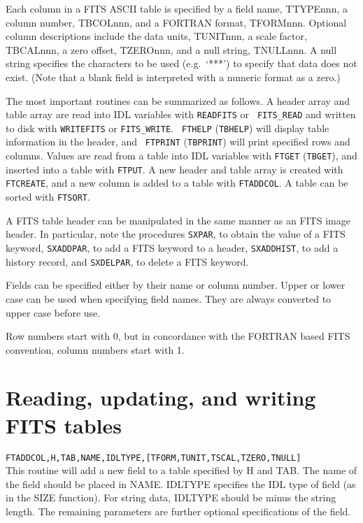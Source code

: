 Each column in a FITS ASCII table 
is specified by a field name, TTYPEnnn, a column number, TBCOLnnn,
and a FORTRAN format, TFORMnnn.  Optional column descriptions include
the data units, TUNITnnn, a scale factor, TBCALnnn, a zero offset,
TZEROnnn, and a null string, TNULLnnn.  A null string specifies the 
characters to be used (e.g.\  `***') to specify that data does not exist.
(Note that a blank field is interpreted with a numeric format as a zero.) 

The most important routines can be summarized as follows. A header array and
table array are read into IDL variables with {\tt READFITS} or {\tt
FITS\_READ}  and written to disk with {\tt WRITEFITS} or {\tt FITS\_WRITE}.  {\tt
FTHELP} ({\tt TBHELP}) will display table information in the header, and {\tt
FTPRINT} ({\tt TBPRINT}) will print specified rows and columns.  Values are read from a table
into IDL variables with {\tt FTGET} ({\tt TBGET}), and inserted into a table with
{\tt FTPUT}.  A new header and table array is created with {\tt FTCREATE}, and
a new column is added to a table with {\tt FTADDCOL}.  A table can be sorted
with {\tt FTSORT}.

A FITS table header can be manipulated in the same manner as an FITS 
image header.
In particular, note the procedures {\tt SXPAR}, to obtain the value of a FITS
keyword, {\tt SXADDPAR}, to add a FITS keyword to a header, {\tt SXADDHIST}, to add
a history record, and {\tt SXDELPAR}, to delete a FITS keyword.

Fields can be specified either by their name or column number.   
Upper or lower case can be used when specifying field names.
They are always converted to upper case before use.

Row numbers start with 0, but in concordance with the FORTRAN based
FITS convention, column numbers start with 1.
                          
\section{Reading, updating, and writing FITS tables}

{\tt FTADDCOL,H,TAB,NAME,IDLTYPE,[TFORM,TUNIT,TSCAL,TZERO,TNULL]} \\

	This routine will add a new field to a table specified by
        H and TAB.  The name of the field should be placed in NAME.
        IDLTYPE specifies the IDL type of field (as in the SIZE
        function).  For string data, IDLTYPE should be minus the
        string length.  The remaining parameters are further optional
        specifications of the field.  \\
 

